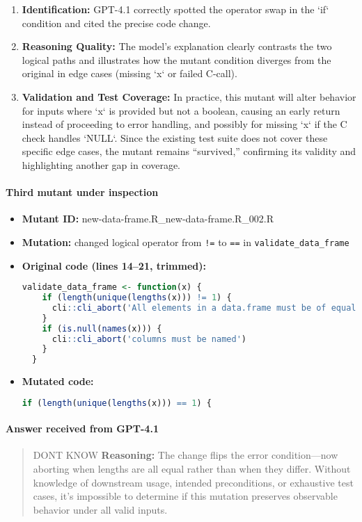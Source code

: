 \begin{enumerate}
  \item \textbf{Identification:}  
    GPT-4.1 correctly spotted the operator swap in the `if` condition and cited the precise code change.
  
  \item \textbf{Reasoning Quality:}  
    The model’s explanation clearly contrasts the two logical paths and illustrates how the mutant condition diverges from the original in edge cases (missing `x` or failed C-call).
  
  \item \textbf{Validation and Test Coverage:}  
    In practice, this mutant will alter behavior for inputs where `x` is provided but not a boolean, causing an early return instead of proceeding to error handling, and possibly for missing `x` if the C check handles `NULL`. Since the existing test suite does not cover these specific edge cases, the mutant remains “survived,” confirming its validity and highlighting another gap in coverage.
\end{enumerate}

\paragraph{Third mutant under inspection}
\begin{itemize}
  \item \textbf{Mutant ID:} new-data-frame.R\_new-data-frame.R\_002.R  
  \item \textbf{Mutation:} changed logical operator from \texttt{!=} to \texttt{==} in \texttt{validate\_data\_frame}
  \item \textbf{Original code (lines 14–21, trimmed):}
  \begin{lstlisting}[language=R]
  validate_data_frame <- function(x) {
    if (length(unique(lengths(x))) != 1) {
      cli::cli_abort('All elements in a data.frame must be of equal length')
    }
    if (is.null(names(x))) {
      cli::cli_abort('columns must be named')
    }
  }
  \end{lstlisting}
  \item \textbf{Mutated code:}
  \begin{lstlisting}[language=R]
    if (length(unique(lengths(x))) == 1) {
  \end{lstlisting}
\end{itemize}

\paragraph{Answer received from GPT-4.1}
\begin{quote}
DONT KNOW  
\textbf{Reasoning:}  
The change flips the error condition—now aborting when lengths are all equal rather than when they differ. Without knowledge of downstream usage, intended preconditions, or exhaustive test cases, it’s impossible to determine if this mutation preserves observable behavior under all valid inputs.
\end{quote}

